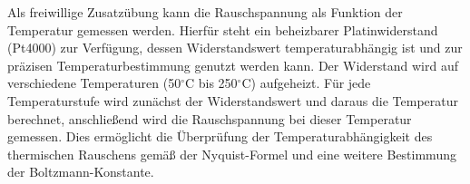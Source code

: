 Als freiwillige Zusatzübung kann die Rauschspannung als Funktion der Temperatur gemessen werden. Hierfür steht ein beheizbarer Platinwiderstand (Pt4000) zur Verfügung, dessen Widerstandswert temperaturabhängig ist und zur präzisen Temperaturbestimmung genutzt werden kann. Der Widerstand wird auf verschiedene Temperaturen (50$^\circ$C bis 250$^\circ$C) aufgeheizt. Für jede Temperaturstufe wird zunächst der Widerstandswert und daraus die Temperatur berechnet, anschließend wird die Rauschspannung bei dieser Temperatur gemessen. Dies ermöglicht die Überprüfung der Temperaturabhängigkeit des thermischen Rauschens gemäß der Nyquist-Formel und eine weitere Bestimmung der Boltzmann-Konstante.